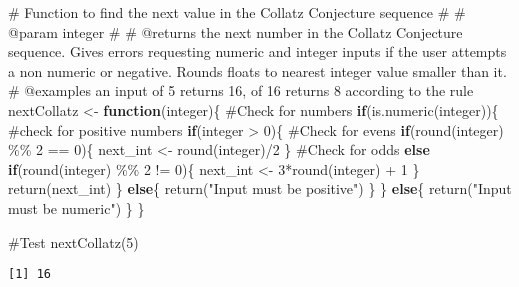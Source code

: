 \documentclass[
  letterpaper,
  DIV=11,
  numbers=noendperiod]{scrartcl}
\newenvironment{Shaded}{\begin{snugshade}}{\end{snugshade}}
\newcommand{\CommentTok}[1]{\textcolor[rgb]{0.37,0.37,0.37}{#1}}
\newcommand{\ControlFlowTok}[1]{\textcolor[rgb]{0.00,0.23,0.31}{\textbf{#1}}}
\newcommand{\DecValTok}[1]{\textcolor[rgb]{0.68,0.00,0.00}{#1}}
\newcommand{\FunctionTok}[1]{\textcolor[rgb]{0.28,0.35,0.67}{#1}}
\newcommand{\NormalTok}[1]{\textcolor[rgb]{0.00,0.23,0.31}{#1}}
\newcommand{\OtherTok}[1]{\textcolor[rgb]{0.00,0.23,0.31}{#1}}
\newcommand{\SpecialCharTok}[1]{\textcolor[rgb]{0.37,0.37,0.37}{#1}}
\newcommand{\StringTok}[1]{\textcolor[rgb]{0.13,0.47,0.30}{#1}}
\begin{document}
\begin{Shaded}
\begin{Highlighting}[]
\CommentTok{\#\textquotesingle{} Function to find the next value in the Collatz Conjecture sequence}
\CommentTok{\#\textquotesingle{}}
\CommentTok{\#\textquotesingle{} @param integer }
\CommentTok{\#\textquotesingle{}}
\CommentTok{\#\textquotesingle{} @returns the next number in the Collatz Conjecture sequence. Gives errors requesting numeric and integer inputs if the user attempts a non numeric or negative. Rounds floats to nearest integer value smaller than it.}
\CommentTok{\#\textquotesingle{} @examples an input of 5 returns 16, of 16 returns 8 according to the rule}
\NormalTok{nextCollatz }\OtherTok{\textless{}{-}} \ControlFlowTok{function}\NormalTok{(integer)\{}
  \CommentTok{\#Check for numbers}
  \ControlFlowTok{if}\NormalTok{(}\FunctionTok{is.numeric}\NormalTok{(integer))\{}
    \CommentTok{\#check for positive numbers}
    \ControlFlowTok{if}\NormalTok{(integer }\SpecialCharTok{\textgreater{}} \DecValTok{0}\NormalTok{)\{}
      \CommentTok{\#Check for evens}
      \ControlFlowTok{if}\NormalTok{(}\FunctionTok{round}\NormalTok{(integer) }\SpecialCharTok{\%\%} \DecValTok{2} \SpecialCharTok{==} \DecValTok{0}\NormalTok{)\{}
\NormalTok{        next\_int }\OtherTok{\textless{}{-}} \FunctionTok{round}\NormalTok{(integer)}\SpecialCharTok{/}\DecValTok{2}
\NormalTok{      \}}
      \CommentTok{\#Check for odds}
      \ControlFlowTok{else} \ControlFlowTok{if}\NormalTok{(}\FunctionTok{round}\NormalTok{(integer) }\SpecialCharTok{\%\%} \DecValTok{2} \SpecialCharTok{!=} \DecValTok{0}\NormalTok{)\{}
\NormalTok{        next\_int }\OtherTok{\textless{}{-}} \DecValTok{3}\SpecialCharTok{*}\FunctionTok{round}\NormalTok{(integer) }\SpecialCharTok{+} \DecValTok{1}
\NormalTok{      \}}
      \FunctionTok{return}\NormalTok{(next\_int)}
\NormalTok{    \}}
    \ControlFlowTok{else}\NormalTok{\{}
      \FunctionTok{return}\NormalTok{(}\StringTok{"Input must be positive"}\NormalTok{)}
\NormalTok{    \}}
\NormalTok{  \}}
  \ControlFlowTok{else}\NormalTok{\{}
    \FunctionTok{return}\NormalTok{(}\StringTok{"Input must be numeric"}\NormalTok{)}
\NormalTok{  \}}
\NormalTok{\}}

\CommentTok{\#Test}
\FunctionTok{nextCollatz}\NormalTok{(}\DecValTok{5}\NormalTok{)}
\end{Highlighting}
\end{Shaded}

\begin{verbatim}
[1] 16
\end{verbatim}
\end{document}

